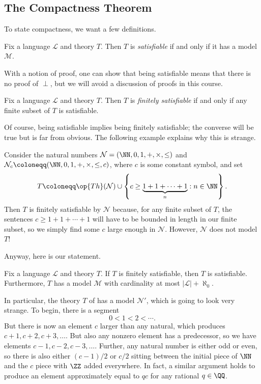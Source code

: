 \documentclass[../notes.tex]{subfiles}
\begin{document}
\subsection{The Compactness Theorem}
To state compactness, we want a few definitions.
\begin{definition}[satisfiable]
	Fix a language $\mathcal L$ and theory $T$. Then $T$ is \textit{satisfiable} if and only if it has a model $\mathcal M$.
\end{definition}
With a notion of proof, one can show that being satisfiable means that there is no proof of $\perp$, but we will avoid a discussion of proofs in this course.
\begin{definition}
	Fix a language $\mathcal L$ and theory $T$. Then $T$ is \textit{finitely satisfiable} if and only if any finite subset of $T$ is satisfiable.
\end{definition}
Of course, being satisfiable implies being finitely satisfiable; the converse will be true but is far from obvious. The following example explains why this is strange.
\begin{example} \label{ex:non-standard-n}
	Consider the natural numbers $\mathcal N=(\NN,0,1,+,\times,\le)$ and $\mathcal N_c\coloneqq(\NN,0,1,+,\times,\le,c)$, where $c$ is some constant symbol, and set
	\[T\coloneqq\op{Th}(\mathcal N)\cup\left\{c\ge\underbrace{1+1+\cdots+1}_n:n\in\NN\right\}.\]
	Then $T$ is finitely satisfiable by $\mathcal N$ because, for any finite subset of $T$, the sentences $c\ge1+1+\cdots+1$ will have to be bounded in length in our finite subset, so we simply find some $c$ large enough in $\mathcal N$. However, $\mathcal N$ does not model $T$!
\end{example}
Anyway, here is our statement.
\begin{theorem}[compactness] \label{thm:compactness}
	Fix a language $\mathcal L$ and theory $T$. If $T$ is finitely satisfiable, then $T$ is satisfiable. Furthermore, $T$ has a model $\mathcal M$ with cardinality at most $\left|\mathcal L\right|+\aleph_0$.
\end{theorem}
\begin{remark}
	In particular, the theory $T$ of  has a model $\mathcal N'$, which is going to look very strange. To begin, there is a segment
	\[0<1<2<\cdots.\]
	But there is now an element $c$ larger than any natural, which produces $c+1,c+2,c+3,\ldots$. But also any nonzero element has a predecessor, so we have elements $c-1,c-2,c-3,\ldots$. Further, any natural number is either odd or even, so there is also either $(c-1)/2$ or $c/2$ sitting between the initial piece of $\NN$ and the $c$ piece with $\ZZ$ added everywhere. In fact, a similar argument holds to produce an element approximately equal to $qc$ for any rational $q\in\QQ$.
\end{remark}
\end{document}
